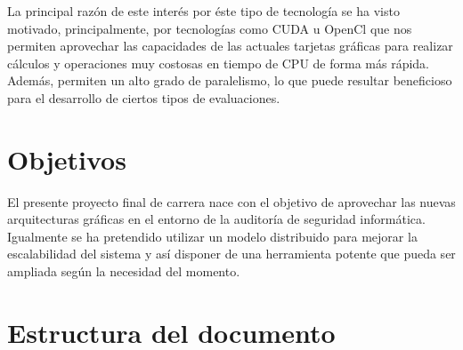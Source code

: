 La principal razón de este interés por éste tipo de tecnología se ha visto motivado, principalmente, por tecnologías como CUDA u OpenCl que nos permiten aprovechar las capacidades de las actuales tarjetas gráficas para realizar cálculos y operaciones muy costosas en tiempo de CPU de forma más rápida. Además, permiten un alto grado de paralelismo, lo que puede resultar beneficioso para el desarrollo de ciertos tipos de evaluaciones.

\section{Objetivos}
El presente proyecto final de carrera nace con el objetivo de aprovechar las nuevas arquitecturas gráficas en el entorno de la auditoría de seguridad informática. Igualmente se ha pretendido utilizar un modelo distribuido para mejorar la escalabilidad del sistema y así disponer de una herramienta potente que pueda ser ampliada según la necesidad del momento.

\section{Estructura del documento}

